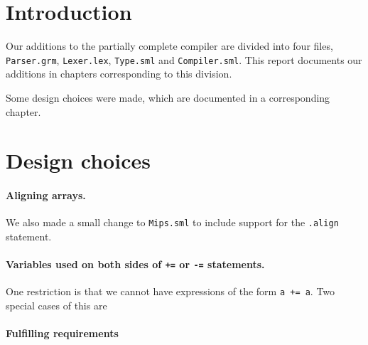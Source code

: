 \section{Introduction}
Our additions to the partially complete compiler are divided into four
files, {\tt Parser.grm}, {\tt Lexer.lex}, {\tt Type.sml} and {\tt Compiler.sml}.
This report documents our additions in chapters corresponding to this division.

Some design choices were made, which are documented in a corresponding chapter.

\section{Design choices}

\paragraph{Aligning arrays.}
We also made a small change to {\tt Mips.sml} to include support for the
{\tt .align} statement.

\paragraph{Variables used on both sides of {\tt +=} or {\tt -=} statements.}
One restriction is that we cannot have expressions of the form \verb!a += a!.
Two special cases of this are

\paragraph{Fulfilling requirements}

